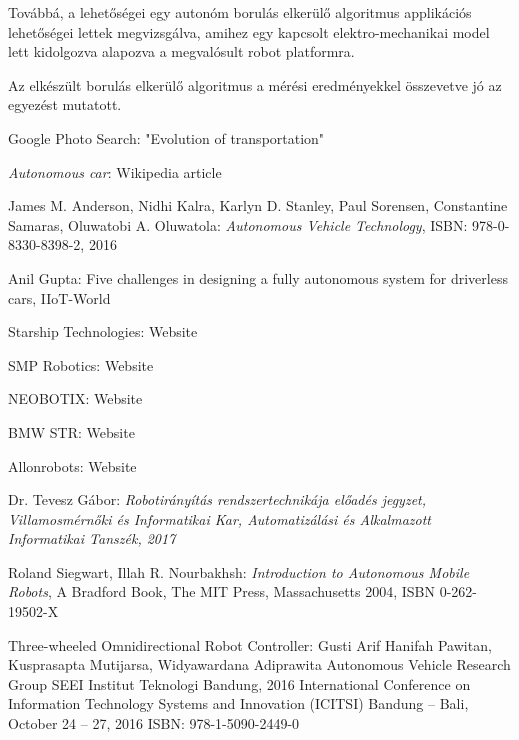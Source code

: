\documentclass[12pt,english,twoside]{article}
\begin{document}
Továbbá, a lehetőségei egy autonóm borulás elkerülő algoritmus applikációs lehetőségei lettek megvizsgálva, amihez egy kapcsolt elektro-mechanikai model lett kidolgozva alapozva a megvalósult robot platformra. 

\noindent Az elkészült borulás elkerülő algoritmus a mérési 
eredményekkel összevetve jó az egyezést mutatott.


\newpage
\newpage
\begin{thebibliography}{1}
	
	
	 Google Photo Search: "Evolution of transportation"
	
	\emph{Autonomous car}: Wikipedia article
	
	James M. Anderson, Nidhi Kalra, Karlyn D. Stanley, Paul Sorensen, Constantine Samaras, Oluwatobi A. Oluwatola: \emph{Autonomous Vehicle Technology}, ISBN: 978-0-8330-8398-2, 2016
	
	Anil Gupta: Five challenges in designing a fully autonomous system for driverless cars, IIoT-World
	
	Starship Technologies: Website
	
	SMP Robotics: Website
	
	NEOBOTIX: Website
	
	BMW STR: Website
	
	 Allonrobots: Website
	
	Dr. Tevesz Gábor:
	\emph{Robotirányítás rendszertechnikája előadés jegyzet, Villamosmérnőki és Informatikai Kar, Automatizálási és Alkalmazott Informatikai Tanszék, 2017}
	
	Roland Siegwart, Illah R. Nourbakhsh:
	\emph{Introduction to Autonomous Mobile Robots}, A Bradford Book, The MIT Press, Massachusetts 2004,
	ISBN 0-262-19502-X
	
	 Three-wheeled Omnidirectional Robot Controller: Gusti Arif Hanifah Pawitan, Kusprasapta Mutijarsa, Widyawardana Adiprawita
	Autonomous Vehicle Research Group SEEI Institut Teknologi Bandung, 2016 International Conference on Information Technology Systems and Innovation (ICITSI)
	Bandung – Bali, October 24 – 27, 2016 ISBN: 978-1-5090-2449-0
	

\end{thebibliography}
\end{document}
